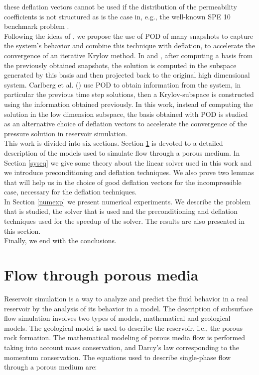 \documentclass[12pt]{article}
\numberwithin{equation}{section}
\begin{document}
these deflation vectors cannot be used if the distribution of the permeability coefficients  is not 
structured as is the case in, e.g., the well-known SPE 10 benchmark problem \cite{Christie01}.\\
Following the ideas of \cite{Astrid11,Mark06,Pasetto16,Carlberg15}, we propose the use of POD of many snapshots to capture the system's behavior and combine this technique with deflation, to  accelerate the convergence of an iterative Krylov method. In \cite{Astrid11,Mark06} and \cite{Pasetto16}, after computing a basis from the previously obtained snapshots, the solution is computed in the subspace generated by this basis and then projected back to the original high dimensional system. Carlberg et al. (\cite{Carlberg15}) use POD to obtain information from the system, in particular the previous time step solutions, then a Krylov-subspace is constructed using the information obtained previously.
In this work, instead of computing the solution in the low dimension subspace, the basis obtained with POD is studied as an alternative choice of deflation vectors 
to accelerate the convergence of the pressure solution in reservoir simulation.  \\
This work is divided into six sections. 
  Section \ref{fpm} is devoted to a detailed description of the models used to simulate flow through a porous medium. In Section \ref{syseq} we give some theory about the linear solver used in this work and we introduce preconditioning and deflation techniques. We also prove two lemmas that will help us in the choice of good deflation vectors for the incompressible case, necessary for the deflation techniques.\\
 In Section \ref{numexp} we present numerical experiments. We describe the problem that is studied, the solver that is used and the preconditioning and deflation techniques used for the speedup of the solver. The results are also presented in this section. \\
 Finally, we end with the conclusions.
 
 
 \newpage
 \section{Flow through porous media}\label{fpm}
\hspace{0.5cm}Reservoir simulation is a way to analyze and predict the fluid behavior in a real reservoir
by the analysis of its behavior in a model. The description of subsurface flow simulation involves two types of models, mathematical and geological models. The geological model is used to describe the reservoir, i.e., the porous rock formation. 
The mathematical modeling of porous media flow is performed taking into account mass conservation, and Darcy's law
corresponding to the momentum conservation. The equations used to describe single-phase flow through a porous medium are:\\
\end{document}
